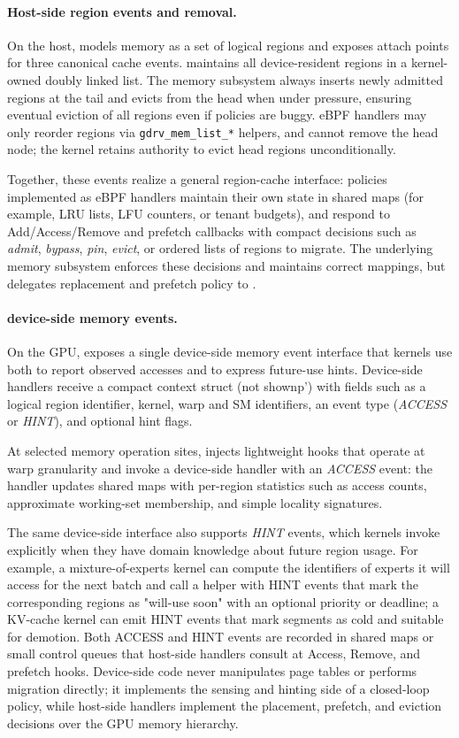 \paragraph{Host-side region events and removal.}
On the host, \sys models memory as a set of logical regions and exposes attach points for three
canonical cache events. \sys maintains all device-resident regions in a kernel-owned doubly linked list. The memory subsystem always inserts newly admitted regions at the tail and evicts from the head when under pressure, ensuring eventual eviction of all regions even if policies are buggy. eBPF handlers may only reorder regions via \texttt{gdrv\_mem\_list\_*} helpers, and cannot remove the head node; the kernel retains authority to evict head regions unconditionally.

Together, these events realize a
general region-cache interface: policies implemented as eBPF handlers maintain their
own state in shared maps (for example, LRU lists, LFU counters, or tenant budgets),
and respond to Add/Access/Remove and prefetch callbacks with compact decisions
such as \emph{admit}, \emph{bypass}, \emph{pin}, \emph{evict}, or ordered lists
of regions to migrate. The underlying memory subsystem enforces these decisions
and maintains correct mappings, but delegates replacement and prefetch policy to
\sys.

\paragraph{device-side memory events.}

On the GPU, \sys exposes a single device-side memory event interface that kernels
use both to report observed accesses and to express future-use hints. Device-side
handlers receive a compact context struct (not shownp') with fields such as a logical
region identifier, kernel, warp and SM identifiers, an event type (\emph{ACCESS}
or \emph{HINT}), and optional hint flags.

At selected memory operation sites, \sys injects lightweight hooks that operate at
warp granularity and invoke a device-side \sys handler with an \emph{ACCESS} event:
the handler updates shared maps with per-region statistics such as access counts,
approximate working-set membership, and simple locality signatures.\

The same device-side interface also supports \emph{HINT} events, which kernels
invoke explicitly when they have domain knowledge about future region usage. For
example, a mixture-of-experts kernel can compute the identifiers of experts it
will access for the next batch and call a \sys helper with HINT events that mark
the corresponding regions as "will-use soon" with an optional priority or deadline;
a KV-cache kernel can emit HINT events that mark segments as cold and suitable for
demotion. Both ACCESS and HINT events are recorded in shared maps or small control
queues that host-side \sys handlers consult at Access, Remove, and prefetch hooks.
Device-side code never manipulates page tables or performs migration directly; it
implements the sensing and hinting side of a closed-loop policy, while host-side
\sys handlers implement the placement, prefetch, and eviction decisions over the
GPU memory hierarchy.


